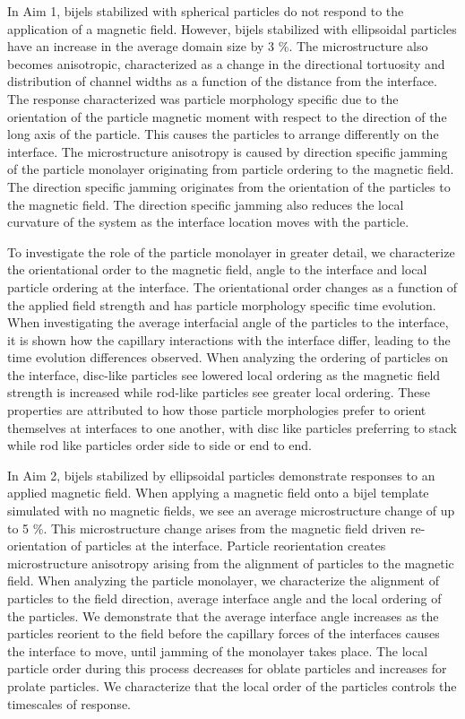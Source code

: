 In Aim 1, bijels stabilized with spherical particles do not respond to the application of a magnetic field. However, bijels stabilized
with ellipsoidal particles have an increase in the average domain size by 3 \%. The microstructure also becomes anisotropic, 
characterized as a change in the directional tortuosity and distribution of channel widths as a function of the distance from the 
interface. The response characterized was particle morphology specific due to the orientation of the particle magnetic moment with 
respect to the direction of the long axis of the particle. This causes the particles to arrange differently on the interface. The 
microstructure anisotropy is caused by direction specific jamming of the particle monolayer originating from particle ordering to 
the magnetic field. The direction specific jamming originates from the orientation of the particles to the magnetic field. The direction
specific jamming also reduces the local curvature of the system as the interface location moves with the particle.

To investigate the role of the particle monolayer in greater detail, we characterize the orientational order to the magnetic field,
angle to the interface and local particle ordering at the interface. The orientational order changes as a function of the applied field 
strength and has particle morphology specific time evolution. When investigating the average interfacial angle of the particles to the 
interface, it is shown how the capillary interactions with the interface differ, leading to the time evolution differences observed.
When analyzing the ordering of particles on the interface, disc-like particles see lowered local ordering as the magnetic field strength is 
increased while rod-like particles see greater local ordering. These properties are attributed to how those particle morphologies prefer 
to orient themselves at interfaces to one another, with disc like particles preferring to stack while rod like particles order side to side 
or end to end.

In Aim 2, bijels stabilized by ellipsoidal particles demonstrate responses to an applied magnetic field. When applying a magnetic field
onto a bijel template simulated with no magnetic fields, we see an average microstructure change of up to 5 \%. This microstructure change
arises from the magnetic field driven re-orientation of particles at the interface. Particle reorientation creates microstructure anisotropy
arising from the alignment of particles to the magnetic field. When analyzing the particle monolayer, we characterize the alignment of particles
to the field direction, average interface angle and the local ordering of the particles. We demonstrate that the average interface angle increases
as the particles reorient to the field before the capillary forces of the interfaces causes the interface to move, until jamming of the monolayer takes
place. The local particle order during this process decreases for oblate particles and increases for prolate particles. We characterize that the local 
order of the particles controls the timescales of response.

